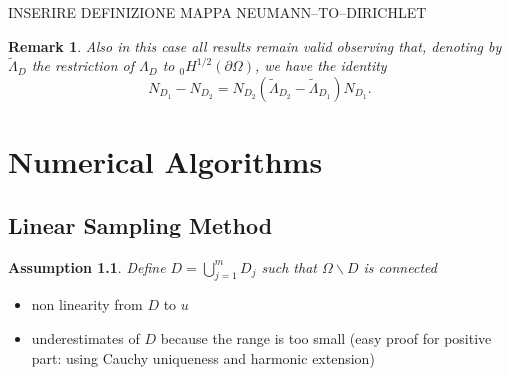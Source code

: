 \documentclass[10pt, a4paper, twoside, openright]{book}
\theoremstyle{definition}
\theoremstyle{plain}
\theoremstyle{plain}
\theoremstyle{plain}
\theoremstyle{plain}
\newtheorem{remark}[subsection]{Remark}
\theoremstyle{plain}
\theoremstyle{plain}
\theoremstyle{plain}
\newtheorem{assumption}[subsection]{Assumption}
\theoremstyle{plain}
\begin{document}
INSERIRE DEFINIZIONE MAPPA NEUMANN--TO--DIRICHLET

\begin{remark}
Also in this case all results remain valid observing  that, denoting by $\tilde\Lambda_D$ the restriction of 
$\Lambda_D$ to $_0H^{1/2}(\partial\Omega)$, we have the identity
$$N_{D_1}-N_{D_2}=N_{D_2}(\tilde\Lambda_{D_2}-\tilde\Lambda_{D_1})N_{D_1}.$$
\end{remark}

\chapter{Numerical Algorithms}
\section{Linear Sampling Method}
\begin{assumption}
\label{assumption:connected}
 Define $D=\bigcup_{j=1}^mD_j$ such that $\Omega\backslash D$ is connected
\end{assumption}
\begin{itemize}
 \item non linearity from $D$ to $u$
 \item underestimates of $D$ because the range is too small (easy proof for positive part: using Cauchy uniqueness and harmonic extension)
\end{itemize}
\end{document}
